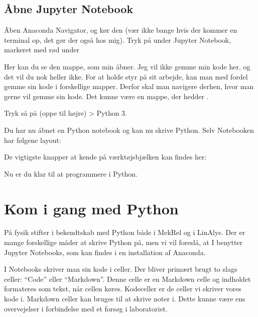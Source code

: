 \documentclass[letterpaper,10pt,english]{jupyterBook}
\begin{document}
\section{Åbne Jupyter Notebook}
\label{\detokenize{notebooks/Download_guide_anaconda/Download_anaconda_jupyter:abne-jupyter-notebook}}
Åben Anaconda Navigator, og kør den (vær ikke bange hvis der kommer en terminal op, det gør der også hos mig). Tryk på  under Jupyter Notebook, markeret med rød under

 Her kan du se den mappe, som min åbner. Jeg vil ikke gemme min kode her, og det vil du nok heller ikke. For at holde styr på sit arbejde, kan man med fordel gemme sin kode i forskellige mapper. Derfor skal man navigere derhen, hvor man gerne vil gemme sin kode. Det kunne være en mappe, der hedder .


Tryk så på  (oppe til højre) > Python 3.

Du har nu åbnet en Python notebook og kan nu skrive Python. Selv Notebooken har følgene layout:


De vigtigste knapper at kende på værktøjsbjælken kan findes her:


Nu er du klar til at programmere i Python.


\chapter{Kom i gang med Python}
\label{\detokenize{notebooks/Basal_python:kom-i-gang-med-python}}\label{\detokenize{notebooks/Basal_python::doc}}
På fysik stifter i bekendtskab med Python både i MekRel og i LinAlys. Der er mange forskellige måder at skrive Python på, men vi vil foreslå, at I benytter Jupyter Notebooks, som kan findes i en installation af Anaconda.

I Notebooks skriver man sin kode i celler. Der bliver primært brugt to slags celler: “Code” eller “Markdown”. Denne celle er en Markdown celle og indholdet formateres som tekst, når cellen køres. Kodeceller er de celler vi skriver vores kode i. Markdown celler kan bruges til at skrive noter i. Dette kunne være ens overvejelser i forbindelse med et forsøg i laboratoriet.
\end{document}
